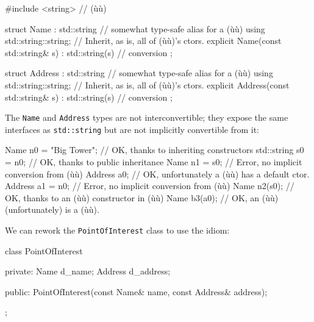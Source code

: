 \begin{emcppshiddenlisting}[emcppsbatch=e11]
#include <string>   // (ù{}ù)
\end{emcppshiddenlisting}
\begin{emcppslisting}[emcppsbatch=e11]
struct Name : std::string  // somewhat type-safe alias for a (ù{}ù)
{
    using std::string::string;  // Inherit, as is, all of (ù{}ù)'s ctors.
    explicit Name(const std::string& s) : std::string(s) { }  // conversion
};

struct Address : std::string  // somewhat type-safe alias for a (ù{}ù)
{
    using std::string::string;  // Inherit, as is, all of (ù{}ù)'s ctors.
    explicit Address(const std::string& s) : std::string(s) { }  // conversion
};
\end{emcppslisting}
    
\noindent The \lstinline!Name! and \lstinline!Address! types are not interconvertible; they expose the same interfaces as \lstinline!std::string! but are not
implicitly convertible from it:

\begin{emcppslisting}[emcppsbatch=e11]
Name n0 = "Big Tower";  // OK, thanks to inheriting constructors
std::string s0 = n0;    // OK, thanks to public inheritance
Name n1 = s0;           // Error, no implicit conversion from (ù{}ù)
Address a0;             // OK, unfortunately a (ù{}ù) has a default ctor.
Address a1 = n0;        // Error, no implicit conversion from (ù{}ù)
Name n2(s0);            // OK, thanks to an (ù{}ù) constructor in (ù{}ù)
Name b3(a0);            // OK, an (ù{}ù) (unfortunately) is a (ù{}ù).
\end{emcppslisting}
    
\noindent We can rework the \lstinline!PointOfInterest! class to use the
 idiom:

\begin{emcppslisting}[emcppsbatch=e11]
class PointOfInterest
{
private:
    Name    d_name;
    Address d_address;

public:
    PointOfInterest(const Name& name, const Address& address);
};
\end{emcppslisting}
    
